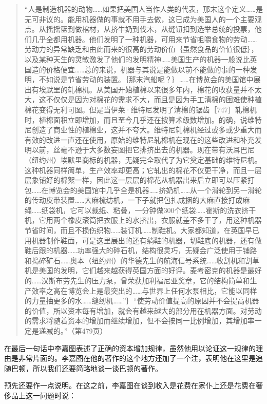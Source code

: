 \begin{quote}{“人是制造机器的动物……如果把美国人当作人类的代表，那末这个定义……是无可非议的。能用机器做的事就不用手去做，这已成为美国人的一个主要观点。从摇摇篮到做棺材，从挤牛奶到伐木，从缝钮扣到选举总统的投票，他们几乎全都用机器。他们发明了一种机器，可用来节省咀嚼食物的劳动……劳动力的异常缺乏和由此而来的很高的劳动价值｛虽然食品的价值很低｝，以及某种天生的灵敏激发了他们的发明精神……美国生产的机器一般说比英国造的价格便宜……总的来说，机器与其说是能做以前不能做的事的一种发明，不如说是节省劳动的装置。｛那末汽船呢？｝……在博览会的美国馆中展出有埃默里的轧棉机。从美国开始植棉以来很多年内，棉花的收获量并不太大，这不仅仅是因为对棉花的需求不大，而且是因为手工清棉的困难使种植棉花变得无利可图。但是当伊莱·维特尼发明了清棉的锯齿［747］轧棉机时，植棉面积立即增加，而且至今几乎还在按算术级数增加。的确，说维特尼创造了商业性的植棉业，这并不夸大。维特尼轧棉机经过或多或少重大而有效的改进一直还在使用，原始的维特尼轧棉机在现在的这些改进和补充发明以前，丝毫不逊于大多数妄图把它排挤出去的机器。现在带有沃耳巴尼（纽约州）埃默里商标的机器，无疑完全取代了为它奠定基础的维特尼机。这种机器同样简单，生产效率却更高；它轧出的棉花不仅更干净，而且一层层象铺好的棉絮一样，因此这一层层的棉花从机器出来后立即可以压紧打包……在博览会的美国馆中几乎全是机器……挤奶机……从一个滑轮到另一滑轮的传动皮带装置……大麻梳纺机，一下子就把包扎成捆的大麻直接打成麻绳……纸袋机，它可以裁纸、粘叠，一分钟做300个纸袋……霍斯的洗衣挤干机，它用两个橡皮滚筒把衣服上的水挤出，衣服就差不多干了，用这种机器节省时间，而且不损伤织物……装订机……制鞋机。大家都知道，在英国早已用机器制作鞋面，可是这里展出的还有绱鞋的机器，切鞋底的机器，还有做鞋后跟的机器……功率强大的碎石机，结构很灵巧，无疑会广泛使用于铺路和捣碎矿石……奥本（纽约州）的华德先生的航海信号系统……收割机和割草机是美国的发明，它们越来越获得英国方面的好评。麦考密克的机器是最好的……汉斯布劳先生的压力泵，曾荣获加利福尼亚奖章，它的结构简单和生产效率之高在博览会上是最突出的……与世界上任何水泵相比，它能以同样的力量抽更多的水……缝纫机……”｝“使劳动价值提高的原因并不会提高机器的价值，所以资本每有增加，就会有越来越大的部分用在机器方面。对劳动的需求将随着资本的增加而继续增加，但不会按同一比例增加，其增加率一定是递减的。”（第479页）}\end{quote}

在最后一句话中李嘉图表述了正确的资本增加规律，虽然他用以论证这一规律的理由是非常片面的。李嘉图在他的著作的这个地方还加了一个注，表明他在这里是追随巴顿，所以我们还要简略地谈一谈巴顿的著作。

预先还要作一点说明。在这之前，李嘉图在谈到收入是花费在家仆上还是花费在奢侈品上这一问题时说：

